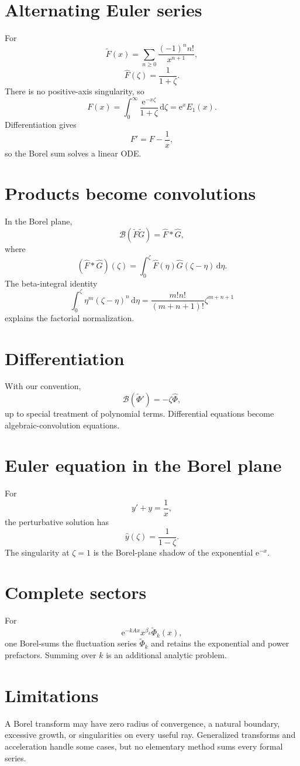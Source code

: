 \documentclass[11pt,oneside,openany]{book}
\newcommand{\e}{\mathrm{e}}
\newcommand{\dd}{\,\mathrm{d}}
\newcommand{\Borel}{\mathcal{B}}
\theoremstyle{plain}
\theoremstyle{definition}
\theoremstyle{remark}
\begin{document}
\section{Alternating Euler series}
For
\[
  \widetilde F(x)=\sum_{n\ge0}\frac{(-1)^nn!}{x^{n+1}},
\]
\[
  \widehat F(\zeta)=\frac1{1+\zeta}.
\]
There is no positive-axis singularity, so
\[
  F(x)=\int_0^\infty\frac{\e^{-x\zeta}}{1+\zeta}\dd\zeta
  =\e^xE_1(x).
\]
Differentiation gives
\[
  F'=F-\frac1x,
\]
so the Borel sum solves a linear ODE.

\section{Products become convolutions}
In the Borel plane,
\[
  \Borel(\widetilde F\widetilde G)
  =\widehat F*\widehat G,
\]
where
\[
  (\widehat F*\widehat G)(\zeta)
  =\int_0^\zeta\widehat F(\eta)
  \widehat G(\zeta-\eta)\dd\eta.
\]
The beta-integral identity
\[
  \int_0^\zeta\eta^m(\zeta-\eta)^n\dd\eta
  =\frac{m!n!}{(m+n+1)!}\zeta^{m+n+1}
\]
explains the factorial normalization.

\section{Differentiation}
With our convention,
\[
  \Borel(\widetilde\Phi')=-\zeta\widehat\Phi,
\]
up to special treatment of polynomial terms. Differential equations become algebraic-convolution equations.

\section{Euler equation in the Borel plane}
For
\[
  y'+y=\frac1x,
\]
the perturbative solution has
\[
  \widehat y(\zeta)=\frac1{1-\zeta}.
\]
The singularity at $\zeta=1$ is the Borel-plane shadow of the exponential $\e^{-x}$.

\section{Complete sectors}
For
\[
  \e^{-kAx}x^{\beta_k}\widetilde\Phi_k(x),
\]
one Borel-sums the fluctuation series $\widetilde\Phi_k$ and retains the exponential and power prefactors. Summing over $k$ is an additional analytic problem.

\section{Limitations}
A Borel transform may have zero radius of convergence, a natural boundary, excessive growth, or singularities on every useful ray. Generalized transforms and acceleration handle some cases, but no elementary method sums every formal series.
\end{document}
